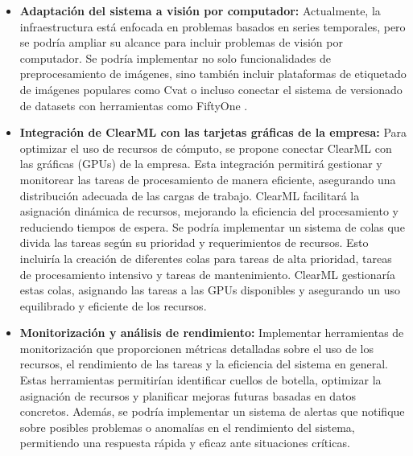 \begin{itemize}
    \item \textbf{Adaptación del sistema a visión por computador:} Actualmente, la infraestructura 
    está enfocada en problemas basados en series temporales, pero se podría ampliar
    su alcance para incluir problemas de visión por computador. Se podría implementar
    no solo funcionalidades de preprocesamiento de imágenes, sino también incluir
    plataformas de etiquetado de imágenes populares como Cvat \cite{CVAT} o incluso conectar el
    sistema de versionado de datasets con herramientas como FiftyOne \cite{FiftyOne}.
    \item \textbf{Integración de ClearML con las tarjetas gráficas de la empresa:} Para 
    optimizar el uso de recursos de cómputo, se propone conectar ClearML con las 
    gráficas (GPUs) de la empresa. Esta integración permitirá gestionar y monitorear las 
    tareas de procesamiento de manera eficiente, asegurando una distribución adecuada de las 
    cargas de trabajo. ClearML facilitará la asignación dinámica de recursos, mejorando 
    la eficiencia del procesamiento y reduciendo tiempos de espera. Se podría implementar un 
    sistema de colas que divida las tareas según su prioridad y requerimientos de recursos. 
    Esto incluiría la creación de diferentes colas para tareas de alta prioridad, 
    tareas de procesamiento intensivo y tareas de mantenimiento. ClearML gestionaría estas colas, 
    asignando las tareas a las GPUs disponibles y asegurando un uso equilibrado y eficiente de los recursos.
    \item \textbf{Monitorización y análisis de rendimiento:} Implementar herramientas de monitorización 
    que proporcionen métricas detalladas sobre el uso de los recursos, el rendimiento de las 
    tareas y la eficiencia del sistema en general. Estas herramientas permitirían identificar 
    cuellos de botella, optimizar la asignación de recursos y planificar mejoras futuras 
    basadas en datos concretos. Además, se podría implementar un sistema de alertas que
    notifique sobre posibles problemas o anomalías en el rendimiento del sistema, permitiendo
    una respuesta rápida y eficaz ante situaciones críticas.
\end{itemize}